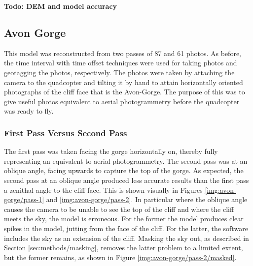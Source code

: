 \textbf{Todo: DEM and model accuracy} \\

\subsection{Avon Gorge}
\label{sec:results/avon-gorge}

This model was reconstructed from two passes of 87 and 61 photos. As before, the
time interval with time offset techniques were used for taking photos and
geotagging the photos, respectively. The photos were taken by attaching the
camera to the quadcopter and tilting it by hand to attain horizontally oriented
photographs of the cliff face that is the Avon-Gorge. The purpose of this was to
give useful photos equivalent to aerial photogrammetry before the quadcopter was
ready to fly.

\subsubsection{First Pass Versus Second Pass}
\label{sec:results/avon-gorge/passes}

The first pass was taken facing the gorge horizontally on, thereby fully
representing an equivalent to aerial photogrammetry. The second pass was at an
oblique angle, facing upwards to capture the top of the gorge. As expected, the
second pass at an oblique angle produced less accurate results than the first
pass a zenithal angle to the cliff face. This is shown visually in Figures
\ref{img:avon-gorge/pass-1} and \ref{img:avon-gorge/pass-2}. In particular where
the oblique angle causes the camera to be unable to see the top of the cliff and
where the cliff meets the sky, the model is erroneous. For the former the model
produces clear spikes in the model, jutting from the face of the cliff. For the
latter, the software includes the sky as an extension of the cliff. Masking the
sky out, as described in Section \ref{sec:methods/masking}, removes the latter
problem to a limited extent, but the former remains, as shown in Figure
\ref{img:avon-gorge/pass-2/masked}.

